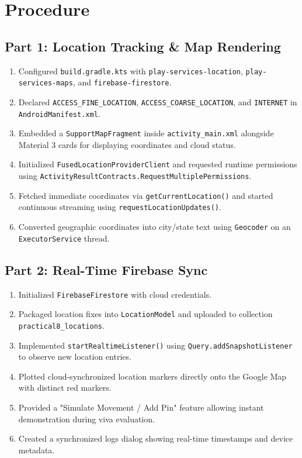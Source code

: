 \documentclass[12pt,a4paper]{article}
\begin{document}
\section*{Procedure}

\subsection*{Part 1: Location Tracking \& Map Rendering}
\begin{enumerate}[itemsep=3pt]
  \item Configured \texttt{build.gradle.kts} with \texttt{play-services-location}, \texttt{play-services-maps}, and \texttt{firebase-firestore}.
  \item Declared \texttt{ACCESS\_FINE\_LOCATION}, \texttt{ACCESS\_COARSE\_LOCATION}, and \texttt{INTERNET} in \texttt{AndroidManifest.xml}.
  \item Embedded a \texttt{SupportMapFragment} inside \texttt{activity\_main.xml} alongside Material 3 cards for displaying coordinates and cloud status.
  \item Initialized \texttt{FusedLocationProviderClient} and requested runtime permissions using \texttt{ActivityResultContracts.RequestMultiplePermissions}.
  \item Fetched immediate coordinates via \texttt{getCurrentLocation()} and started continuous streaming using \texttt{requestLocationUpdates()}.
  \item Converted geographic coordinates into city/state text using \texttt{Geocoder} on an \texttt{ExecutorService} thread.
\end{enumerate}

\subsection*{Part 2: Real-Time Firebase Sync}
\begin{enumerate}[itemsep=3pt]
  \item Initialized \texttt{FirebaseFirestore} with cloud credentials.
  \item Packaged location fixes into \texttt{LocationModel} and uploaded to collection \texttt{practical8\_locations}.
  \item Implemented \texttt{startRealtimeListener()} using \texttt{Query.addSnapshotListener} to observe new location entries.
  \item Plotted cloud-synchronized location markers directly onto the Google Map with distinct red markers.
  \item Provided a "Simulate Movement / Add Pin" feature allowing instant demonstration during viva evaluation.
  \item Created a synchronized logs dialog showing real-time timestamps and device metadata.
\end{enumerate}
\end{document}
